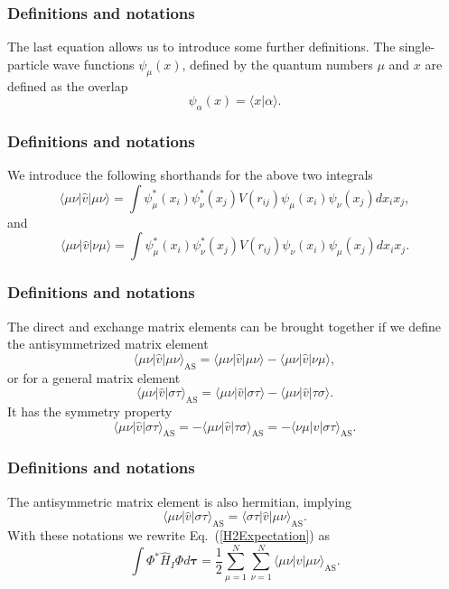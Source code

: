 \documentclass{beamer}
\begin{document}
\begin{frame}
\frametitle{Definitions and notations}

\begin{block}{}
The last equation allows us to  introduce some further definitions.  
The single-particle wave functions $\psi_{\mu}(x)$, defined by the quantum numbers $\mu$ and $x$
are defined as the overlap 
\[
   \psi_{\alpha}(x)  = \langle x | \alpha \rangle .
\]
\end{block}
\end{frame}

\begin{frame}
\frametitle{Definitions and notations}

\begin{block}{}
We introduce the following shorthands for the above two integrals
\[
\langle \mu\nu|\hat{v}|\mu\nu\rangle =  \int \psi_{\mu}^*(x_i)\psi_{\nu}^*(x_j)V(r_{ij})\psi_{\mu}(x_i)\psi_{\nu}(x_j)
    dx_ix_j,
\]
and
\[
\langle \mu\nu|\hat{v}|\nu\mu\rangle = \int \psi_{\mu}^*(x_i)\psi_{\nu}^*(x_j)
  V(r_{ij})\psi_{\nu}(x_i)\psi_{\mu}(x_j)
  dx_ix_j.  
\]
\end{block}
\end{frame}

\begin{frame}
\frametitle{Definitions and notations}

\begin{block}{}
The direct and exchange matrix elements can be  brought together if we define the antisymmetrized matrix element
\[
\langle \mu\nu|\hat{v}|\mu\nu\rangle_{\mathrm{AS}}= \langle \mu\nu|\hat{v}|\mu\nu\rangle-\langle \mu\nu|\hat{v}|\nu\mu\rangle,
\]
or for a general matrix element  
\[
\langle \mu\nu|\hat{v}|\sigma\tau\rangle_{\mathrm{AS}}= \langle \mu\nu|\hat{v}|\sigma\tau\rangle-\langle \mu\nu|\hat{v}|\tau\sigma\rangle.
\]
It has the symmetry property
\[
\langle \mu\nu|\hat{v}|\sigma\tau\rangle_{\mathrm{AS}}= -\langle \mu\nu|\hat{v}|\tau\sigma\rangle_{\mathrm{AS}}=-\langle \nu\mu|\hat{v}|\sigma\tau\rangle_{\mathrm{AS}}.
\]
\end{block}
\end{frame}

\begin{frame}
\frametitle{Definitions and notations}

\begin{block}{}
The antisymmetric matrix element is also hermitian, implying 
\[
\langle \mu\nu|\hat{v}|\sigma\tau\rangle_{\mathrm{AS}}= \langle \sigma\tau|\hat{v}|\mu\nu\rangle_{\mathrm{AS}}.
\]
With these notations we rewrite Eq.~(\ref{H2Expectation}) as 
\begin{equation}
  \int \Phi^*\hat{H}_I\Phi d\mathbf{\tau} 
  = \frac{1}{2}\sum_{\mu=1}^N\sum_{\nu=1}^N \langle \mu\nu|\hat{v}|\mu\nu\rangle_{\mathrm{AS}}.
\label{H2Expectation2}
\end{equation}
\end{block}
\end{frame}
\end{document}
